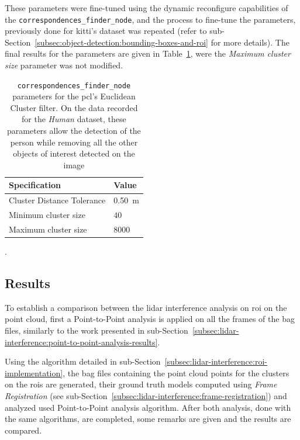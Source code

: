 These parameters were fine-tuned using the dynamic reconfigure capabilities of the \texttt{correspondences\_finder\_node}, and the process to fine-tune the parameters, previously done for \ac{kitti}'s dataset was repeated (refer to sub-Section~\ref{subsec:object-detection:bounding-boxes-and-roi} for more details). The final results for the parameters are given in Table~\ref{tab:experimental-euclidian-cluster-specs}, were the \textit{Maximum cluster size} parameter was not modified.


\begin{table}[!ht]
	\centering
	\renewcommand{\arraystretch}{1.2}
	\begin{tabular}{@{}p{6cm}l@{}}
	 \toprule
	 Specification & Value \\
	 \midrule
	 Cluster Distance Tolerance & \SI{0.50}{\meter} \\
	 Minimum cluster size & $40$ \\
	 Maximum cluster size & $8000$ \\
	 \bottomrule
	\end{tabular}
	\caption[Euclidian cluster parameters to select only the \ac{roi} containing the person on the \textit{Human} dataset.] {\texttt{correspondences\_finder\_node} parameters for the \ac{pcl}'s Euclidean Cluster filter. On the data recorded for the \textit{Human} dataset, these parameters allow the detection of the person while removing all the other objects of interest detected on the image}.
	\label{tab:experimental-euclidian-cluster-specs}
\end{table}

\subsection{Results}
To establish a comparison between the \ac{lidar} interference analysis on \ac{roi} on the point cloud, first a Point-to-Point analysis is applied on all the frames of the bag files, similarly to the work presented in sub-Section~\ref{subsec:lidar-interference:point-to-point-analysis-results}.

Using the algorithm detailed in sub-Section~\ref{subsec:lidar-interference:roi-implementation}, the bag files containing the point cloud points for the clusters on the \acp{roi} are generated, their ground truth models computed using \textit{Frame Registration} (see sub-Section~\ref{subsec:lidar-interference:frame-registration}) and analyzed used Point-to-Point analysis algorithm. After both analysis, done with the same algorithms, are completed, some remarks are given and the results are compared.

